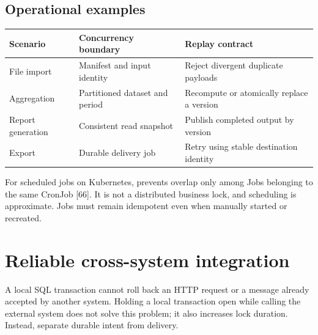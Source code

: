 \section{Operational examples}
\begin{longtable}{L{.26\linewidth}L{.34\linewidth}L{.32\linewidth}}
\toprule Scenario & Concurrency boundary & Replay contract \\ \midrule\endhead
File import & Manifest and input identity & Reject divergent duplicate payloads \\
Aggregation & Partitioned dataset and period & Recompute or atomically replace a version \\
Report generation & Consistent read snapshot & Publish completed output by version \\
Export & Durable delivery job & Retry using stable destination identity \\
\bottomrule
\end{longtable}
For scheduled jobs on Kubernetes,  prevents
overlap only among Jobs belonging to the same CronJob [66]. It is not a
distributed business lock, and scheduling is approximate. Jobs must remain
idempotent even when manually started or recreated.

\chapter{Reliable cross-system integration}
\label{ch:enterprise-outbox}
A local SQL transaction cannot roll back an HTTP request or a message
already accepted by another system. Holding a local transaction open while
calling the external system does not solve this problem; it also increases
lock duration. Instead, separate durable intent from delivery.

